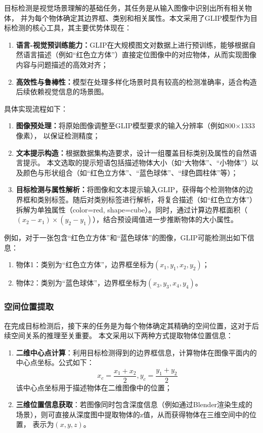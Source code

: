 目标检测是视觉场景理解的基础任务，其任务是从输入图像中识别出所有相关物体，
并为每个物体确定其边界框、类别和相关属性。本文采用了GLIP模型作为目标检测的核心工具，其主要优势体现在：
\begin{enumerate}[nosep] 
\item \textbf{语言-视觉预训练能力：}GLIP在大规模图文对数据上进行预训练，能够根据自然语言描述（例如“红色立方体”）直接定位图像中的对应物体，从而实现图像内容与问题描述的高效对齐； 
\item \textbf{高效性与鲁棒性：}模型在处理多样化场景时具有较高的检测准确率，适合构造后续依赖视觉信息的场景图。 
\end{enumerate}

具体实现流程如下：
\begin{enumerate}[nosep] 
\item \textbf{图像预处理：}将原始图像调整至GLIP模型要求的输入分辨率（例如800$\times$1333像素），
以保证检测精度； 
\item \textbf{文本提示构造：}根据数据集构造要求，设计一组覆盖目标类别及属性的自然语言提示。
本文选取的提示短语包括描述物体大小（如“大物体”、“小物体”）以及颜色与形状组合（如“红色立方体”、“蓝色球体”、“绿色圆柱体”等）； 
\item \textbf{目标检测与属性解析：}将图像和文本提示输入GLIP，获得每个检测物体的边界框和类别标签。随后对类别标签进行解析，将复合描述（如“红色立方体”）拆解为单独属性（color=red, shape=cube）。同时，通过计算边界框面积（$(x_2 - x_1)\times(y_2 - y_1)$），结合预设阈值进一步推断物体的大小属性。 
\end{enumerate}

例如，对于一张包含“红色立方体”和“蓝色球体”的图像，GLIP可能检测出如下信息： 
\begin{enumerate}[nosep] 
\item 物体1：类别为“红色立方体”，边界框坐标为$(x_1, y_1, x_2, y_2)$； 
\item 物体2：类别为“蓝色球体”，边界框坐标为$(x_3, y_3, x_4, y_4)$。 
\end{enumerate}
\subsubsection{空间位置提取}
在完成目标检测后，接下来的任务是为每个物体确定其精确的空间位置，这对于后续空间关系的推理至关重要。
本文采用以下两种方式提取物体位置信息：
\begin{enumerate}
\item \textbf{二维中心点计算}：利用目标检测得到的边界框信息，计算物体在图像平面内的中心点坐标。公式如下：
$$x_c = \frac{x_1+x_2}{2}, y_c = \frac{y_1 + y_2}{2}$$
该中心点坐标用于描述物体在二维图像中的位置；
\item \textbf{三维位置信息获取}：若图像同时包含深度信息（例如通过Blender渲染生成的场景），则可直接从深度图中提取物体的z值，从而获得物体在三维空间中的位置，
表示为$(x, y, z)$。
\end{enumerate}

